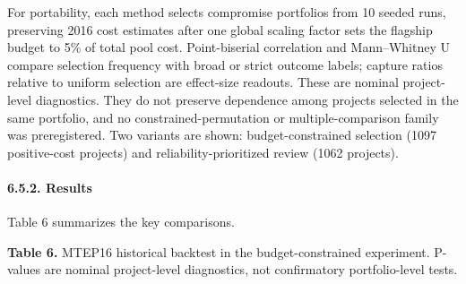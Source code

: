 \documentclass[
]{article}
\begin{document}
For portability, each method selects compromise portfolios from 10 seeded runs, preserving 2016 cost estimates after one global scaling factor sets the flagship budget to 5\% of total pool cost. Point-biserial correlation and Mann--Whitney U compare selection frequency with broad or strict outcome labels; capture ratios relative to uniform selection are effect-size readouts. These are nominal project-level diagnostics. They do not preserve dependence among projects selected in the same portfolio, and no constrained-permutation or multiple-comparison family was preregistered. Two variants are shown: budget-constrained selection (1097 positive-cost projects) and reliability-prioritized review (1062 projects).

\paragraph{6.5.2. Results}\label{results-1}

Table 6 summarizes the key comparisons.

\textbf{Table 6.} MTEP16 historical backtest in the budget-constrained experiment. P-values are nominal project-level diagnostics, not confirmatory portfolio-level tests.
\end{document}
